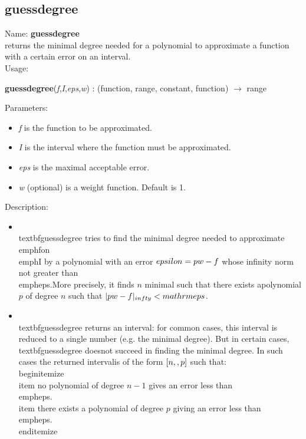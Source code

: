 \subsection{guessdegree}
\label{labguessdegree}
\noindent Name: \textbf{guessdegree}\\
returns the minimal degree needed for a polynomial to approximate a function with a certain error on an interval.\\
\noindent Usage: 
\begin{center}
\textbf{guessdegree}(\emph{f},\emph{I},\emph{eps},\emph{w}) : (\textsf{function}, \textsf{range}, \textsf{constant}, \textsf{function}) $\rightarrow$ \textsf{range}\\
\end{center}
Parameters: 
\begin{itemize}
\item \emph{f} is the function to be approximated.
\item \emph{I} is the interval where the function must be approximated.
\item \emph{eps} is the maximal acceptable error.
\item \emph{w} (optional) is a weight function. Default is 1.
\end{itemize}
\noindent Description: \begin{itemize}

\item \\textbf{guessdegree} tries to find the minimal degree needed to approximate \\emph{f}\n   on \\emph{I} by a polynomial with an error $\\epsilon=p w - f$ whose infinity norm not greater than \\emph{eps}.\n   More precisely, it finds $n$ minimal such that there exists a\n   polynomial $p$ of degree $n$ such that $\\|p w-f\\|_{\\infty} < \\mathrm{eps}$.\n
\item \\textbf{guessdegree} returns an interval: for common cases, this interval is reduced to a \n   single number (e.g. the minimal degree). But in certain cases, \\textbf{guessdegree} does\n   not succeed in finding the minimal degree. In such cases the returned interval\n   is of the form $[n,\\,p]$ such that:\n   \\begin{itemize}\n   \\item no polynomial of degree $n-1$ gives an error less than \\emph{eps}.\n   \\item there exists a polynomial of degree $p$ giving an error less than \\emph{eps}. \n   \\end{itemize}\n\end{itemize}
